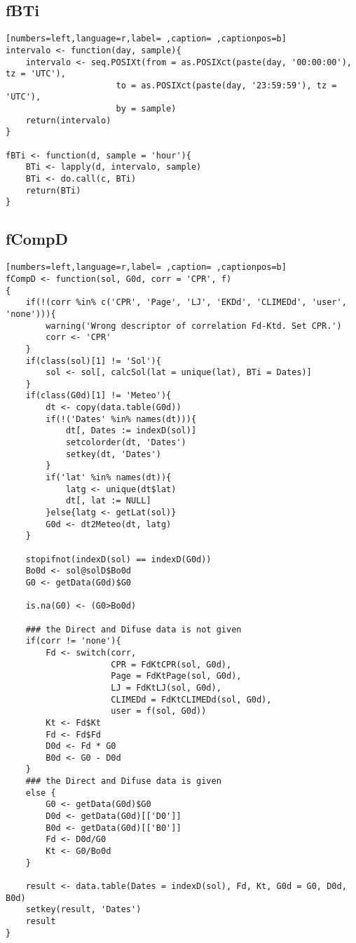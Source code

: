 \subsection{fBTi}
\label{sec:org83fdbf9}
\begin{lstlisting}[numbers=left,language=r,label= ,caption= ,captionpos=b]
intervalo <- function(day, sample){
    intervalo <- seq.POSIXt(from = as.POSIXct(paste(day, '00:00:00'), tz = 'UTC'),
                      to = as.POSIXct(paste(day, '23:59:59'), tz = 'UTC'),
                      by = sample)
    return(intervalo)
}

fBTi <- function(d, sample = 'hour'){
    BTi <- lapply(d, intervalo, sample)
    BTi <- do.call(c, BTi)
    return(BTi)
}
\end{lstlisting}
\subsection{fCompD}
\label{sec:orgb8cf7d7}
\begin{lstlisting}[numbers=left,language=r,label= ,caption= ,captionpos=b]
fCompD <- function(sol, G0d, corr = 'CPR', f)
{
    if(!(corr %in% c('CPR', 'Page', 'LJ', 'EKDd', 'CLIMEDd', 'user', 'none'))){
        warning('Wrong descriptor of correlation Fd-Ktd. Set CPR.')
        corr <- 'CPR'
    }
    if(class(sol)[1] != 'Sol'){
        sol <- sol[, calcSol(lat = unique(lat), BTi = Dates)]
    }
    if(class(G0d)[1] != 'Meteo'){
        dt <- copy(data.table(G0d))
        if(!('Dates' %in% names(dt))){
            dt[, Dates := indexD(sol)]
            setcolorder(dt, 'Dates')
            setkey(dt, 'Dates')
        }
        if('lat' %in% names(dt)){
            latg <- unique(dt$lat)
            dt[, lat := NULL]
        }else{latg <- getLat(sol)}
        G0d <- dt2Meteo(dt, latg)
    }  

    stopifnot(indexD(sol) == indexD(G0d))
    Bo0d <- sol@solD$Bo0d
    G0 <- getData(G0d)$G0

    is.na(G0) <- (G0>Bo0d)

    ### the Direct and Difuse data is not given
    if(corr != 'none'){
        Fd <- switch(corr,
                     CPR = FdKtCPR(sol, G0d),
                     Page = FdKtPage(sol, G0d),
                     LJ = FdKtLJ(sol, G0d),
                     CLIMEDd = FdKtCLIMEDd(sol, G0d),
                     user = f(sol, G0d))
        Kt <- Fd$Kt
        Fd <- Fd$Fd
        D0d <- Fd * G0
        B0d <- G0 - D0d
    }
    ### the Direct and Difuse data is given
    else {
        G0 <- getData(G0d)$G0
        D0d <- getData(G0d)[['D0']]
        B0d <- getData(G0d)[['B0']]
        Fd <- D0d/G0
        Kt <- G0/Bo0d
    }

    result <- data.table(Dates = indexD(sol), Fd, Kt, G0d = G0, D0d, B0d)
    setkey(result, 'Dates')
    result
}
\end{lstlisting}
